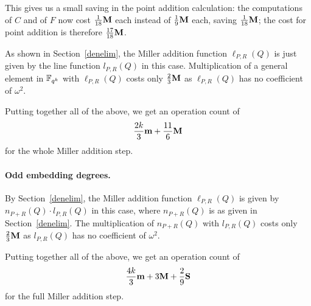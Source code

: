 This gives us a small saving in the point addition calculation: the computations of $C$ and of $F$ now cost $\frac{1}{18}\textbf{M}$ each instead of $\frac{1}{9}\textbf{M}$ each, saving $\frac{1}{18}\textbf{M}$; 
the cost for point addition is therefore $\frac{17}{18}\textbf{M}$.

As shown in Section~\ref{denelim}, the Miller addition function $\ell_{P,R}(Q)$
is just given by the line function $l_{P,R}(Q)$ in this case. Multiplication of a general element in $\mathbb{F}_{q^k}$ with $\ell_{P,R}(Q)$ costs only $\frac{2}{3}\textbf{M}$
as $\ell_{P,R}(Q)$ has no coefficient of $\omega^2$.

Putting together all of the above, we get an operation count of
\[\frac{2k}{3}\textbf{m} + \frac{11}{6}\textbf{M} \]
for the whole Miller addition step.

\paragraph*{Odd embedding degrees.}

By Section~\ref{denelim}, the Miller addition function 
$\ell_{P,R}(Q)$ is given by $n_{P+R}(Q) \cdot l_{P,R}(Q)$ in this case, where
$n_{P+R}(Q)$ is as given in Section~\ref{denelim}.
The multiplication of $n_{P+R}(Q)$ with $l_{P,R}(Q)$ costs only $\frac{2}{3}\textbf{M}$ as $l_{P,R}(Q)$ has no coefficient of $\omega^2$.

Putting together all of the above, we get an operation count of
\[\frac{4k}{3}\textbf{m} + 3\textbf{M} + \frac{2}{9}\textbf{S}\]
for the full Miller addition step.
